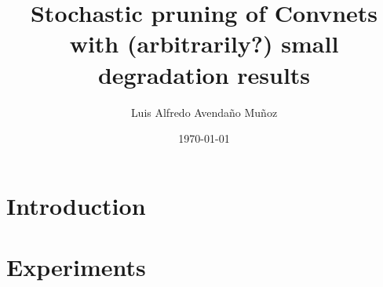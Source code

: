 \documentclass{article}
\title{Stochastic pruning of Convnets with (arbitrarily?) small degradation
results}
\author{Luis Alfredo Avendaño Muñoz}
\date{\today}
\begin{document}
\maketitle
\begin{abstract}
 

\end{abstract}
\section{Introduction}%
\label{sec:introduction}

\section{Experiments}%
\label{sec:experiments}


\printbibliography
%
\end{document}
